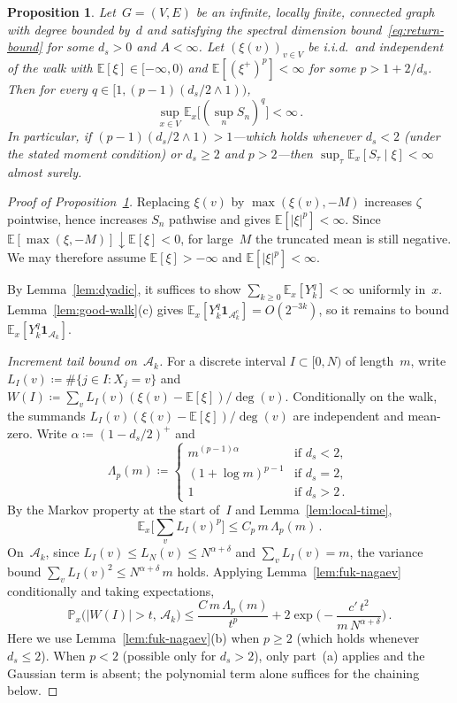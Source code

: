 \documentclass[11pt]{amsart}
\theoremstyle{plain}
\newtheorem{proposition}[theorem]{Proposition}
\theoremstyle{definition}
\newcommand{\E}{\mathbb{E}}
\renewcommand{\P}{\mathbb{P}}
\newcommand{\one}{\mathbf{1}}
\begin{document}
	\begin{proposition}\label{prop:subcritical}
		Let~$G = (V,E)$ be an infinite, locally finite, connected graph with
		degree bounded by~$d$ and satisfying the spectral dimension bound~\eqref{eq:return-bound} for some $d_s>0$ and $A<\infty$.
		Let $(\xi(v))_{v\in V}$ be i.i.d.\ and independent of the walk with
		$\E[\xi] \in [-\infty, 0)$ and $\E[(\xi^+)^p]<\infty$ for some $p>1+2/d_s$.
		Then for every $q\in[1,(p-1)(d_s/2\wedge 1))$,
		\[
		\sup_{x\in V}\E_x\bigl[(\sup_n S_n)^q\bigr]<\infty\,.
		\]
		In particular, if $(p-1)(d_s/2\wedge 1)> 1$---which holds whenever $d_s<2$ (under the stated moment condition) or $d_s\geq 2$ and $p> 2$---then $\sup_\tau\E_x[S_\tau\mid\xi]<\infty$ almost surely.
	\end{proposition}
	
	\begin{proof}[Proof of Proposition~\textup{\ref{prop:subcritical}}]
		Replacing $\xi(v)$ by $\max(\xi(v),-M)$ increases $\zeta$ pointwise, hence increases $S_n$ pathwise and gives $\E[|\xi|^p]<\infty$. Since $\E[\max(\xi,-M)]\downarrow\E[\xi]<0$, for large~$M$ the truncated mean is still negative. We may therefore assume $\E[\xi]>-\infty$ and $\E[|\xi|^p]<\infty$.
		
		By Lemma~\ref{lem:dyadic}, it suffices to show $\sum_{k\geq 0}\E_x[Y_k^q]<\infty$ uniformly in~$x$. Lemma~\ref{lem:good-walk}(c) gives $\E_x[Y_k^q\one_{\mathcal{A}_k^c}]=O(2^{-3k})$, so it remains to bound $\E_x[Y_k^q\one_{\mathcal{A}_k}]$.
		
		\emph{Increment tail bound on~$\mathcal{A}_k$.}
		For a discrete interval $I\subset[0,N)$ of length~$m$, write $L_I(v)\coloneqq\#\{j\in I:X_j=v\}$ and $W(I)\coloneqq\sum_v L_I(v)(\xi(v)-\E[\xi])/\deg(v)$. Conditionally on the walk, the summands $L_I(v)(\xi(v)-\E[\xi])/\deg(v)$ are independent and mean-zero. Write $\alpha\coloneqq(1-d_s/2)^+$ and
		\[
		\Lambda_p(m)\coloneqq\begin{cases}
			m^{(p-1)\alpha} & \text{if } d_s<2,\\[3pt]
			(1{+}\log m)^{p-1} & \text{if } d_s=2,\\[3pt]
			1 & \text{if } d_s>2\,.
		\end{cases}\,
		\]
		By the Markov property at the start of~$I$ and Lemma~\ref{lem:local-time},
		\begin{equation}\label{eq:poly-moment}
			\E_x\biggl[\sum_v L_I(v)^p\biggr]\leq C_p\,m\,\Lambda_p(m)\,.
		\end{equation}
		On~$\mathcal{A}_k$, since $L_I(v)\leq L_N(v)\leq N^{\alpha+\delta}$ and $\sum_v L_I(v)=m$, the variance bound $\sum_v L_I(v)^2\leq N^{\alpha+\delta}\,m$ holds. Applying Lemma~\ref{lem:fuk-nagaev} conditionally and taking expectations,
		\begin{equation}\label{eq:w-tail}
			\P_x\bigl(|W(I)|>t,\,\mathcal{A}_k\bigr)
			\leq\frac{C\,m\,\Lambda_p(m)}{t^p}
			+2\exp\biggl(-\frac{c'\,t^2}{m\,N^{\alpha+\delta}}\biggr)\,.
		\end{equation}
		Here we use Lemma~\ref{lem:fuk-nagaev}(b) when $p\geq 2$ (which holds whenever $d_s\leq 2$). When $p<2$ (possible only for $d_s>2$), only part~(a) applies and the Gaussian term is absent; the polynomial term alone suffices for the chaining below.
		

\end{proof}
\end{document}
